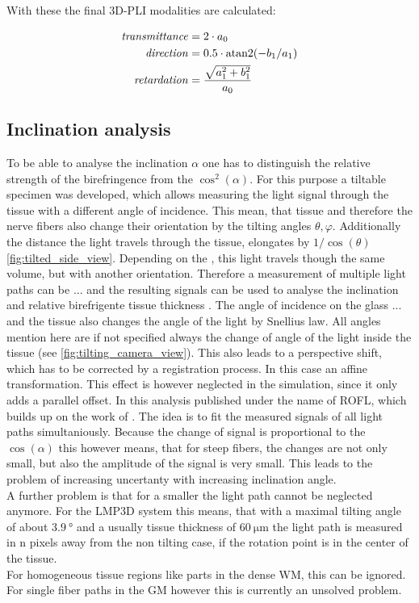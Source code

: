 With these the final \ac{3D-PLI} modalities are calculated:

\begin{align}
\begin{split}
\mathit{transmittance} &= 2 \cdot a_0\\
\mathit{direction} &= 0.5 \cdot \operatorname{atan2}(-b_1 / a_1)\\
\mathit{retardation} &= \frac{\sqrt{a_1^2 + b_1^2}}{a_0}
\end{split}
\end{align}
% 
% 
% 
% 
\subsection{Inclination analysis}
% 
To be able to analyse the inclination $\alpha$ one has to distinguish the relative strength of the birefringence from the $\cos^2(\alpha)$.
For this purpose a tiltable specimen was developed, which allows measuring the light signal through the tissue with a different angle of incidence.
This mean, that tissue and therefore the nerve fibers also change their orientation by the tilting angles $\theta, \varphi$.
Additionally the distance the light travels through the tissue, elongates by $1/\cos(\theta)$ \cref{fig:tilted_side_view}.
% 
Depending on the \pixelsize{}, this light travels though the same volume, but with another orientation.
Therefore a measurement of multiple light paths can be ... and the resulting signals can be used to analyse the inclination and relative birefrigente tissue thickness \trel{}.
The angle of incidence on the glass ... and the tissue also changes the angle of the light by Snellius law.
All angles mention here are if not specified always the change of angle of the light inside the tissue (see \cref{fig:tilting_camera_view}). 
This also leads to a perspective shift, which has to be corrected by a registration process.
In this case an affine transformation.
This effect is however neglected in the simulation, since it only adds a parallel offset.
% 
In \cite{Schmitz2018} this analysis published under the name of \ac{ROFL}, which builds up on the work of \cite{Wiese:887678}.
The idea is to fit the measured signals of all light paths simultaniously.
Because the change of signal is proportional to the $\cos(\alpha)$ this however means, that for steep fibers, the changes are not only small, but also the amplitude of the signal is very small.
This leads to the problem of increasing uncertanty with increasing inclination angle.
\\
A further problem is that for a smaller \pixelsize{} the light path cannot be neglected anymore.
For the \ac{LMP3D} system this means, that with a maximal tilting angle of about $\SI{3.9}{\degree}$ and a usually tissue thickness of $\SI{60}{\micro\meter}$ the light path is measured in n \dummy{} pixels away from the non tilting case, if the rotation point is in the center of the tissue.
\\
For homogeneous tissue regions like parts in the dense \ac{WM}, this can be ignored.
For single fiber paths in the \ac{GM} however this is currently an unsolved problem.
% 
% 
% 
